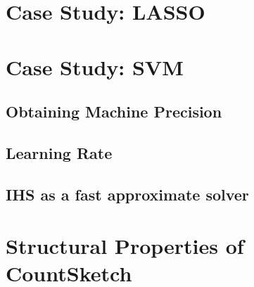 \documentclass[twoside]{article}
\theoremstyle{definition}\newtheorem{thm}{Theorem}[section]
\theoremstyle{definition}\newtheorem{mydef}[thm]{Definition}
\theoremstyle{definition}\newtheorem{rem}[thm]{Remark}
\theoremstyle{definition}\newtheorem{prop}[thm]{Proposition}
\theoremstyle{definition}\newtheorem{example}[thm]{Example}
\theoremstyle{definition}\newtheorem{claim}[thm]{Claim}
\theoremstyle{definition}\newtheorem{Qu}[thm]{Question}
\theoremstyle{definition}\newtheorem{Lemma}[thm]{Lemma}
\theoremstyle{definition}\newtheorem{Cor}[thm]{Corollary}
\theoremstyle{definition}\newtheorem{Fact}[]{Fact}
\begin{document}
\section{Case Study: LASSO} \label{sec: ihs-lasso}


\section{Case Study: SVM}

\subsection{Obtaining Machine Precision}

\subsection{Learning Rate}

\subsection{IHS as a fast approximate solver}


\appendix

\section{Structural Properties of CountSketch} \label{sec: countsketch-proofs}




\end{document}
